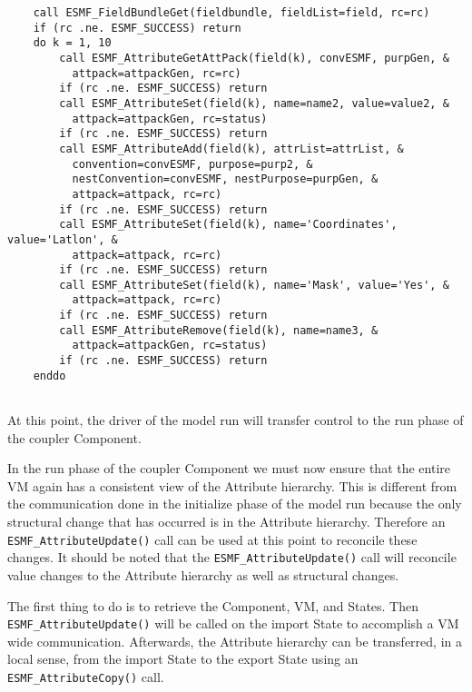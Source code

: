  \begin{verbatim}
    call ESMF_FieldBundleGet(fieldbundle, fieldList=field, rc=rc)
    if (rc .ne. ESMF_SUCCESS) return
    do k = 1, 10
        call ESMF_AttributeGetAttPack(field(k), convESMF, purpGen, &
          attpack=attpackGen, rc=rc)
        if (rc .ne. ESMF_SUCCESS) return
        call ESMF_AttributeSet(field(k), name=name2, value=value2, &
          attpack=attpackGen, rc=status)
        if (rc .ne. ESMF_SUCCESS) return
        call ESMF_AttributeAdd(field(k), attrList=attrList, &
          convention=convESMF, purpose=purp2, &
          nestConvention=convESMF, nestPurpose=purpGen, &
          attpack=attpack, rc=rc)
        if (rc .ne. ESMF_SUCCESS) return
        call ESMF_AttributeSet(field(k), name='Coordinates', value='Latlon', &
          attpack=attpack, rc=rc)
        if (rc .ne. ESMF_SUCCESS) return
        call ESMF_AttributeSet(field(k), name='Mask', value='Yes', &
          attpack=attpack, rc=rc)
        if (rc .ne. ESMF_SUCCESS) return
        call ESMF_AttributeRemove(field(k), name=name3, &
          attpack=attpackGen, rc=status)
        if (rc .ne. ESMF_SUCCESS) return
    enddo
 
\end{verbatim}
 

   At this point, the driver of the model run will transfer control to the
   run phase of the coupler Component. 

   In the run phase of the coupler Component we must now ensure that the
   entire VM again has a consistent view of the Attribute hierarchy.  This
   is different from the communication done in the initialize phase of the
   model run because the only structural change that has occurred is in the
   Attribute hierarchy.  Therefore an {\tt ESMF\_AttributeUpdate()} call can
   be used at this point to reconcile these changes.  It should be noted that
   the {\tt ESMF\_AttributeUpdate()} call will reconcile value changes to the
   Attribute hierarchy as well as structural changes.
  
   The first thing to do is to retrieve the Component, VM, and States.  Then
   {\tt ESMF\_AttributeUpdate()} will be called on the import State to accomplish
   a VM wide communication.  Afterwards, the Attribute hierarchy can be transferred,
   in a local sense, from the import State to the export State using an
   {\tt ESMF\_AttributeCopy()} call. 

